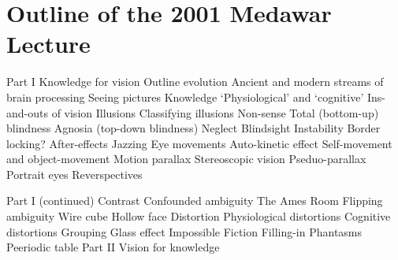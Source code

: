 \documentclass[12pt]{article} %
\newcounter{cenum}
\begin{document}
\section*{Outline of the 2001 Medawar Lecture}
\begin{minipage}[t]{0.45\linewidth}
\begin{outline}
   \1 Part I
      \2 Knowledge for vision
         \3 Outline evolution
         \3 Ancient and modern streams of brain processing
         \3 Seeing pictures
         \3 Knowledge
         \3 `Physiological' and `cognitive'
         \3 Ins-and-outs of vision
         \3 Illusions
         \3 Classifying illusions
      \2 Non-sense
      	\3 Total (bottom-up) blindness
      	\3 Agnosia (top-down blindness)
      	\3 Neglect
      	\3 Blindsight
      \2 Instability
      	\3 Border locking?
      	\3 After-effects
      	\3 Jazzing
      	\3 Eye movements
      	\3 Auto-kinetic effect
      	\3 Self-movement and object-movement
      	\3 Motion parallax
      	\3 Stereoscopic vision
      	\3 Pseduo-parallax
      	\3 Portrait eyes
      	\3 Reverspectives
\end{outline}
\end{minipage}
\hspace{0.5cm}
\begin{minipage}[t]{0.45\linewidth}
\begin{outline}
	\1 Part I (continued)
	\2 Contrast
	\2 Confounded ambiguity
      	\3 The Ames Room
      \2 Flipping ambiguity
      	\3 Wire cube
      	\3 Hollow face
     	\2 Distortion
     		\3 Physiological distortions
     		\3 Cognitive distortions
      \2 Grouping
      \2 Glass effect
      \2 Impossible
      \2 Fiction
      	\3 Filling-in
      	\3 Phantasms
      	\3 Peeriodic table
     \setcounter{cenum}{0}
 	\1 Part II
 		\2 Vision for knowledge
\end{outline}
\end{minipage}





\end{document}
